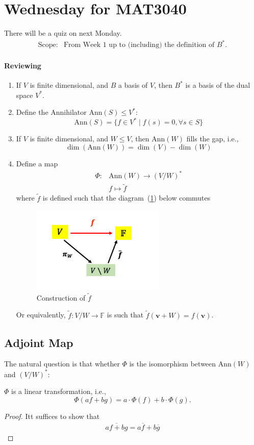 
\section{Wednesday for MAT3040}
There will be a quiz on next Monday. 
\[
\begin{array}{ll}
\text{Scope}:&\text{From Week 1 up to (including) the definition of $B^*$.}
\end{array}
\]

\paragraph{Reviewing}
\begin{enumerate}
\item
If $V$ is finite dimensional, and $B$ a basis of $V$, then $B^*$ is a basis of the dual space $V^*$.
\item
Define the Annihilator $\text{Ann}(S)\le V^*$:
\[
\text{Ann}(S) =\{f\in V^*\mid f(s)=0,\forall s\in S\}
\]
\item
If $V$ is finite dimensional, and $W\le V$, then $\text{Ann}(W)$ fills the gap, i.e.,
\[
\dim(\text{Ann}(W)) = \dim(V) - \dim(W)
\]
\item
Define a map 
\[
\begin{array}{ll}
\Phi:&\text{Ann}(W)\to(V/W)^*\\
&f\mapsto\tilde{f}
\end{array}
\]
where $\tilde{f}$ is defined such that the diagram~(\ref{fig:5:1}) below commutes
\begin{figure}[H]
\centering
\includegraphics[width=0.6\textwidth]{week5/p_3}
\caption{Construction of $\tilde{f}$}
\label{fig:5:1}
\end{figure}
Or equivalently, $\tilde{f}:V/W\to\mathbb{F}$ is such that $\tilde{f}(\bm v+W) = f(\bm v)$.
\end{enumerate}
\subsection{Adjoint Map}
The natural question is that whether $\Phi$ is the isomorphism between $\text{Ann}(W)$ and $(V/W)^*$:
\begin{proposition}
$\Phi$ is a linear transformation, i.e., 
\[
\Phi(af+bg) = a\cdot \Phi(f)+b\cdot\Phi(g).
\]
\end{proposition}
\begin{proof}
Itt suffices to show that 
\begin{align*}
\overline{af+bg} = a\overline{f}+b\overline{g}
\end{align*}
\end{proof}

